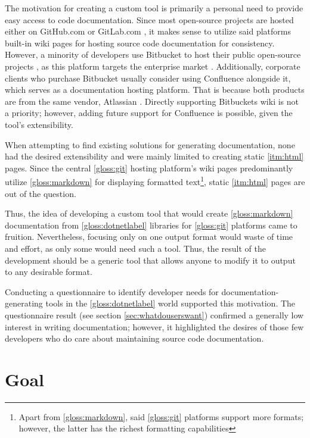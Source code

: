 The motivation for creating a custom tool is primarily a personal need to provide easy access to code documentation. Since most open-source projects are hosted either on GitHub.com or GitLab.com \cite{alphabet_inc_google_2022}, it makes sense to utilize said platforms built-in wiki pages for hosting source code documentation for consistency. However, a minority of developers use Bitbucket to host their public open-source projects \cite{jiricek_why_2022}, as this platform targets the enterprise market \cite{interviewbit_bitbucket_2022}. Additionally, corporate clients who purchase Bitbucket usually consider using Confluence alongside it, which serves as a documentation hosting platform. That is because both products are from the same vendor, Atlassian \cite{interviewbit_bitbucket_2022}. Directly supporting Bitbuckets wiki is not a priority; however, adding future support for Confluence is possible, given the tool's extensibility.

When attempting to find existing solutions for generating documentation, none had the desired extensibility and were mainly limited to creating static \ref{itm:html} pages.
Since the central \ref{gloss:git} hosting platform's wiki pages predominantly utilize \ref{gloss:markdown} for displaying formatted text\footnote{Apart from \ref{gloss:markdown}, said \ref{gloss:git} platforms support more formats; however, the latter has the richest formatting capabilities}, static \ref{itm:html} pages are out of the question.

Thus, the idea of developing a custom tool that would create \ref{gloss:markdown} documentation from \ref{gloss:dotnetlabel} libraries for \ref{gloss:git} platforms came to fruition. Nevertheless, focusing only on one output format would waste of time and effort, as only some would need such a tool. Thus, the result of the development should be a generic tool that allows anyone to modify it to output to any desirable format.

Conducting a questionnaire to identify developer needs for documentation-generating tools in the \ref{gloss:dotnetlabel} world supported this motivation. The questionnaire result (see section \ref{sec:whatdouserswant}) confirmed a generally low interest in writing documentation; however, it highlighted the desires of those few developers who do care about maintaining source code documentation.

\section*{Goal}

